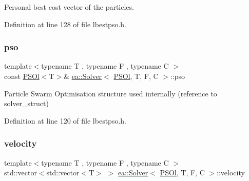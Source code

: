 Personal best cost vector of the particles. 



Definition at line 128 of file lbestpso.\+h.

\mbox{\label{classea_1_1_solver_3_01_p_s_ol_00_01_t_00_01_f_00_01_c_01_4_a3098f083ef04a0ce7ae0eef22dd80442}} 
\subsubsection{\texorpdfstring{pso}{pso}}
{\footnotesize\ttfamily template$<$typename T , typename F , typename C $>$ \\
const \hyperlink{structea_1_1_p_s_ol}{P\+S\+Ol}$<$T$>$\& \hyperlink{classea_1_1_solver}{ea\+::\+Solver}$<$ \hyperlink{structea_1_1_p_s_ol}{P\+S\+Ol}, T, F, C $>$\+::pso\hspace{0.3cm}{\ttfamily [private]}}



Particle Swarm Optimisation structure used internally (reference to solver\+\_\+struct) 



Definition at line 120 of file lbestpso.\+h.

\mbox{\label{classea_1_1_solver_3_01_p_s_ol_00_01_t_00_01_f_00_01_c_01_4_ae8293610cb6bffc00e0fda749754a1f2}} 
\subsubsection{\texorpdfstring{velocity}{velocity}}
{\footnotesize\ttfamily template$<$typename T , typename F , typename C $>$ \\
std\+::vector$<$std\+::vector$<$T$>$ $>$ \hyperlink{classea_1_1_solver}{ea\+::\+Solver}$<$ \hyperlink{structea_1_1_p_s_ol}{P\+S\+Ol}, T, F, C $>$\+::velocity\hspace{0.3cm}{\ttfamily [private]}}



